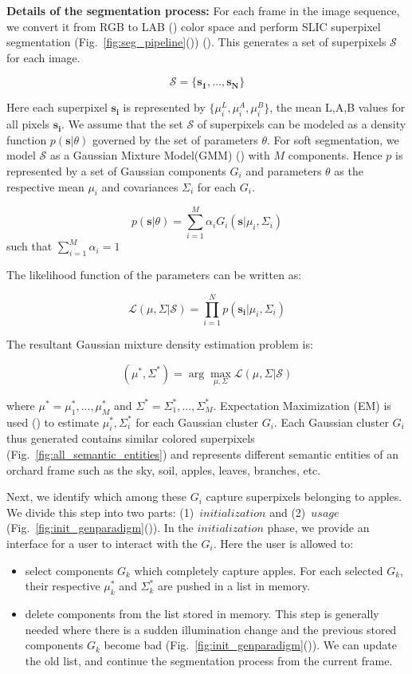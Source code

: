 \textbf{Details of the segmentation process:} For each frame in the image sequence, we convert it from RGB to LAB (\cite{gauch1992comparison}) color space and perform SLIC superpixel segmentation (Fig.~\ref{fig:seg_pipeline}()) (\cite{achanta2012slic}). This generates a set of superpixels $\mathcal{S}$ for each image.

$$\mathcal{S}=\{\mathbf{s_1},...,\mathbf{s_N}\}$$ 

Here each superpixel $\mathbf{s_i}$ is represented by $\{ \mu^L_i, \mu^A_i, \mu^B_i \}$, the mean L,A,B values for all pixels $\mathbf{s_i}$. We assume that the set $\mathcal{S}$ of superpixels can be modeled as a density function $p(\mathbf{s}|\theta)$ governed by the set of parameters $\theta$. For soft segmentation, we model $\mathcal{S}$ as a Gaussian Mixture Model(GMM)  (\cite{chuang2001bayesian, ruzon2000alpha}) with $M$ components. Hence $p$ is represented by a set of Gaussian components $G_i$ and parameters $\theta$ as the respective mean $\mu_i$ and covariances $\Sigma_i$ for each $G_i$. 

$$ p(\mathbf{s}|\theta)=\sum_{i=1}^M{\alpha_i G_i(\mathbf{s}|\mu_i, \Sigma_i)} $$ such that $\sum_{i=1}^M{\alpha_i}=1$

The likelihood function of the parameters can be written as:

$$ \mathcal{L}(\mu,\Sigma|\mathcal{S}) = \prod_{i=1}^N{p(\mathbf{s_i}|\mu_i,\Sigma_i)} $$

The resultant Gaussian mixture density estimation problem is:

$$(\mu^*, \Sigma^*) = \arg\!\max_{\mu, \Sigma} {\mathcal{L}(\mu,\Sigma|\mathcal{S})} $$

where $\mu^*={\mu^*_1,...,\mu^*_M}$ and $\Sigma^*={\Sigma^*_1,...,\Sigma^*_M}$. Expectation Maximization (EM) is used (\cite{em}) to estimate $\mu^*_i, \Sigma^*_i$ for each Gaussian cluster $G_i$. Each Gaussian cluster $G_i$ thus generated contains similar colored superpixels (Fig.~\ref{fig:all_semantic_entities}) and represents different semantic entities of an orchard frame such as the sky, soil, apples, leaves, branches, etc. 

Next, we identify which among these $G_i$ capture superpixels belonging to apples. We divide this step into two parts: (1)~$\textit{initialization}$ and (2)~$\textit{usage}$ (Fig.~\ref{fig:init_genparadigm}()). In the $\textit{initialization}$ phase, we provide an interface for a user to interact with the $G_i$. Here the user is allowed to:
\begin{itemize}
\item select components $G_k$ which completely capture apples. For each selected $G_k$, their respective $\mu_k^*$ and $\Sigma_k^*$ are pushed in a list in memory.
\item delete components from the list stored in memory. This step is generally needed where there is a sudden illumination change and the previous stored components $G_k$ become bad (Fig.~\ref{fig:init_genparadigm}()). We can update the old list, and continue the segmentation process from the current frame.
\end{itemize}

